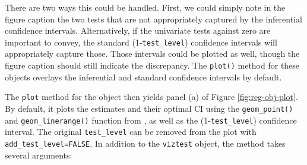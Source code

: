 There are two ways this could be handled. First, we could simply note in the figure caption the two tests that are not appropriately captured by the inferential confidence intervals. Alternatively, if the univariate tests against zero are important to convey, the standard (1-\texttt{test\_level}) confidence intervals will appropriately capture those. Those intervals could be plotted as well, though the figure caption should still indicate the discrepancy. The \texttt{plot()} method for these objects overlays the inferential and standard confidence intervals by default.

The \texttt{plot} method for the object then yields panel (a) of Figure \ref{fig:reg-obj-plot}. By default, it plots the estimates and their optimal CI using the \texttt{geom\_point()} and \texttt{geom\_linerange()} function from , as well as the (1-\texttt{test\_level}) confidence interval. The original \texttt{test\_level} can be removed from the plot with \texttt{add\_test\_level=FALSE}. In addition to the \texttt{viztest} object, the method takes several arguments:

